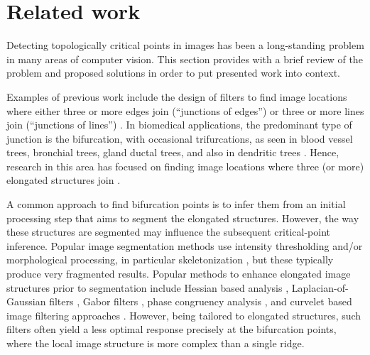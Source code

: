 \section{Related work}
\label{ch2:sec:related-work}
Detecting topologically critical points in images has been a long-standing problem in many areas of computer vision. This section provides with a brief review of the problem and proposed solutions in order to put presented work into context.

Examples of previous work include the design of filters to find image locations where either three or more edges join (``junctions of edges'') \cite{sinzinger2008model, hansen2004neural, laganiere2004detection} or three or more lines join (``junctions of lines'') \cite{yu1998rotated, deschenes2000detection}. In biomedical applications, the predominant type of junction is the bifurcation, with occasional trifurcations, as seen in blood vessel trees, bronchial trees, gland ductal trees, and also in dendritic trees \cite{koene2009netmorph, iber2013control}. Hence, research in this area has focused on finding image locations where three (or more) elongated structures join \cite{tsai2004model, agam2005vessel, bevilacqua2005combined, bhuiyan2007automatic, zhou2007vascular, aibinu2010vascular, calvo2011automatic, obaraa2012contrast, su2012junction, azzopardi2013automatic}.

A common approach to find bifurcation points is to infer them from an initial processing step that aims to segment the elongated structures. However, the way these structures are segmented may influence the subsequent critical-point inference. Popular image segmentation methods use intensity thresholding and/or morphological processing, in particular skeletonization \cite{hoover2000locating, dima2002automatic, he2003automated, weaver2004automated, pool2008neuritetracer, bevilacqua2009comparison, leandro2009automatic, aibinu2010vascular}, but these typically produce very fragmented results. Popular methods to enhance elongated image structures prior to segmentation include Hessian based analysis \cite{frangi1998multiscale, xiong2006automated, zhang2007automated, al2008improved, yuan2009mdl, turetken2011automated, myatt2012neuromantic, basu2013segmentation, santamaria2015automatic}, Laplacian-of-Gaussian filters \cite{chothani2011automated}, Gabor filters \cite{bhuiyan2007automatic, azzopardi2013automatic}, phase congruency analysis \cite{obara2012contrast}, and curvelet based image filtering approaches \cite{narayanaswamy20113}. However, being tailored to elongated structures, such filters often yield a less optimal response precisely at the bifurcation points, where the local image structure is more complex than a single ridge.

